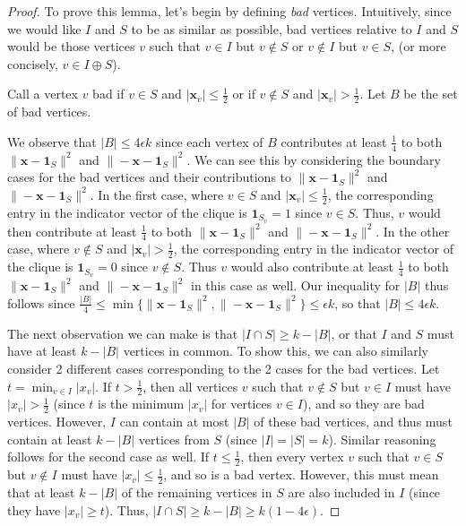 \documentclass{article}
\begin{document}
\begin{proof}
    To prove this lemma, let's begin by defining \emph{bad} vertices.
    Intuitively, since we would like $I$ and $S$ to be as similar as possible, bad vertices relative to $I$ and $S$ would be those vertices
    $v$ such that $v \in I$ but $v \notin S$ or $v \notin I$ but $v \in S$,
    (or more concisely, $v \in I \oplus S$).
    \begin{definition}
        Call a vertex $v$ bad if $v \in S$ and $|\mathbf{x}_{v}| \leq \frac{1}{2}$ or if $v
        \not\in S$ and $|\mathbf{x}_{v}| > \frac{1}{2}$. Let $B$ be the set of bad vertices.
    \end{definition}
    We observe that $|B| \leq 4 \epsilon k$ since each vertex of $B$
    contributes at least $\frac{1}{4}$ to both $\|\mathbf{x} - \mathbf{1}_{S}\|^{2}$ and
    $\|-\mathbf{x} - \mathbf{1}_{S}\|^{2}$. We can see this by considering the boundary
    cases for the bad vertices and their contributions to $\|\mathbf{x} -
    \mathbf{1}_{S}\|^{2}$ and $\|-\mathbf{x} - \mathbf{1}_{S}\|^{2}$. In the first case,
    where $v \in S$ and $|\mathbf{x}_v| \leq \frac{1}{2}$, the corresponding entry in
    the indicator vector of the clique is $\mathbf{1}_{S}_{v} = 1$ since $v \in
    S$. Thus, $v$ would then contribute at least $\frac{1}{4}$ to both $\|\mathbf{x} -
    \mathbf{1}_{S}\|^{2}$ and $\|-\mathbf{x} - \mathbf{1}_{S}\|^{2}$. In the
    other case, where $v \notin S$ and $|\mathbf{x}_{v}| > \frac{1}{2}$, the
    corresponding entry in the indicator vector of the clique is
    $\mathbf{1}_{S}_{v} = 0$ since $v \notin S$. Thus $v$ would also contribute
    at least $\frac{1}{4}$ to both $\|\mathbf{x} -
    \mathbf{1}_{S}\|^{2}$ and $\|-\mathbf{x} - \mathbf{1}_{S}\|^{2}$ in this
    case as well. Our inequality for $|B|$ thus follows since
    $\frac{|B|}{4} \leq \min\{\|\mathbf{x} - \mathbf{1}_{S}\|^{2}, \|-\mathbf{x} - \mathbf{1}_{S}\|^{2}\} \leq
    \epsilon k$, so that $|B| \leq 4 \epsilon k$.

    The next observation we can make is that $|I \cap S| \geq k - |B|$, or that $I$ and $S$ must have at least $k
    - |B|$ vertices in common. To show this, we can also similarly consider 2 different cases
    corresponding to the 2 cases for the bad vertices. Let $t = \min_{v \in I}
    |x_{v}|$. If $t > \frac{1}{2}$, then all vertices $v$ such that $v \notin
    S$ but $v \in I$ must have $|x_{v}| > \frac{1}{2}$ (since $t$ is the
    minimum $|x_{v}|$ for vertices $v \in I$), and so they are bad vertices.
    However, $I$ can contain at most $|B|$ of these bad vertices, and thus must
    contain at least $k - |B|$ vertices from $S$ (since $|I| = |S| = k$).
    Similar reasoning follows for the second case as well. If $t \leq
    \frac{1}{2}$, then every vertex $v$ such that $v \in S$ but $v \notin I$
    must have $|x_{v}| \leq \frac{1}{2}$, and so is a bad vertex. However, this
    must mean that at least $k - |B|$ of the remaining vertices in $S$ are also
    included in $I$ (since they have $|x_v| \geq t$). Thus, $|I \cap S| \geq k
    - |B| \geq k(1 - 4\epsilon)$.
\end{proof}
\end{document}
